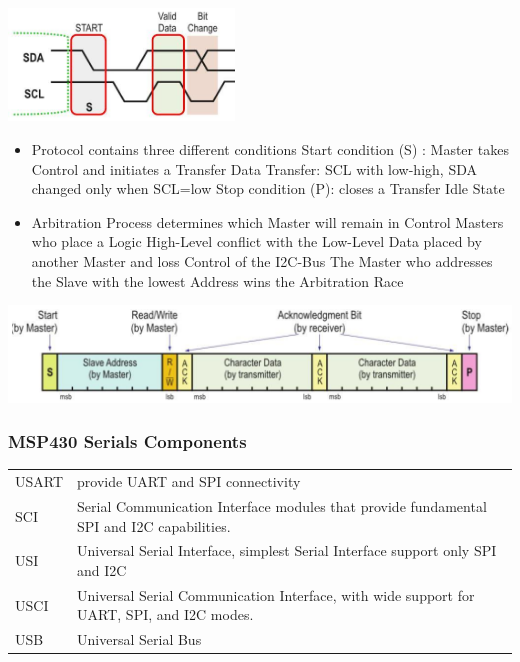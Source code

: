 \includegraphics[width=6cm]{images/i2c_2}\\
\begin{minipage}{\linewidth}
	\begin{itemize}
		\item Protocol contains three different conditions
		\subitem Start condition (S) : Master takes Control and initiates a Transfer
		\subitem Data Transfer: \acs{SCL} with low-high, \acs{SDA} changed only when SCL=low
		\subitem Stop condition (P): closes a Transfer
		\subitem Idle State
		\item Arbitration Process determines which Master will remain in Control
		\subitem Masters who place a Logic High-Level conflict with the Low-Level Data placed by another Master and loss Control of the \acs{I2C}-Bus
		\subitem The Master who addresses the Slave with the lowest Address wins the Arbitration Race
	\end{itemize}
\end{minipage}

\includegraphics[width=16cm]{images/i2c_data}\\


\subsubsection{MSP430 Serials Components}
\begin{tabular}{ll}
    \acs{USART} &
    provide \acs{UART} and \acs{SPI} connectivity\\
    
    \acs{SCI} &
	Serial Communication Interface modules that provide fundamental \acs{SPI} and \acs{I2C} capabilities.\\
    
	\acs{USI} &
	Universal Serial Interface, simplest Serial Interface support only \acs{SPI} and \acs{I2C}\\
    
	\acs{USCI} &
	Universal Serial Communication Interface, with wide support for \acs{UART}, \acs{SPI}, and \acs{I2C} modes.\\
    
	\acs{USB} & Universal Serial Bus\\
    
\end{tabular}
\clearpage
\pagebreak
